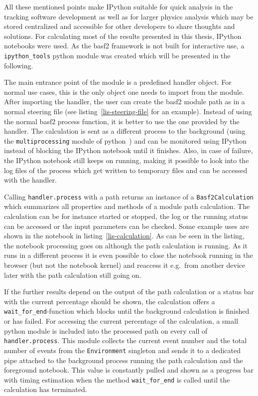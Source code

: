All these mentioned points make IPython suitable for quick analysis in the tracking software development as well as for larger physics analysis which may be stored centralized and accessible for other developers to share thoughts and solutions. For calculating most of the results presented in this thesis, IPython notebooks were used. As the basf2 framework is not built for interactive use, a \texttt{ipython\_tools} python module was created which will be presented in the following.

The main entrance point of the module is a predefined handler object. For normal use cases, this is the only object one needs to import from the module. After importing the handler, the user can create the basf2 module path as in a normal steering file (see listing~\ref{lis-steering-file} for an example). Instead of using the normal basf2 process function, it is better to use the one provided by the handler. The calculation is sent as a different process to the background (using the \texttt{multiprocessing} module of python~\cite{multiprocessing}) and can be monitored using IPython instead of blocking the IPython notebook until it finishes. Also, in case of failure, the IPython notebook still keeps on running, making it possible to look into the log files of the process which get written to temporary files and can be accessed with the handler.

Calling \texttt{handler.process} with a path returns an instance of a \texttt{Basf2Calculation} which summarizes all properties and methods of a module path calculation. The calculation can be for instance started or stopped, the log or the running status can be accessed or the input parameters can be checked. Some example uses are shown in the notebook in listing~\ref{lis-calculation}. As can be seen in the listing, the notebook processing goes on although the path calculation is running. As it runs in a different process it is even possible to close the notebook running in the browser (but not the notebook kernel) and reaccess it e.g.\ from another device later with the path calculation still going on.

If the further results depend on the output of the path calculation or a status bar with the current percentage should be shown, the calculation offers a \verb+wait_for_end+-function which blocks until the background calculation is finished or has failed. For accessing the current percentage of the calculation, a small python module is included into the processed path on every call of \texttt{handler.process}. This module collects the current event number and the total number of events from the \texttt{Environment} singleton and sends it to a dedicated pipe attached to the background process running the path calculation and the foreground notebook. This value is constantly pulled and shown as a progress bar with timing estimation when the method \verb+wait_for_end+ is called until the calculation has terminated.

